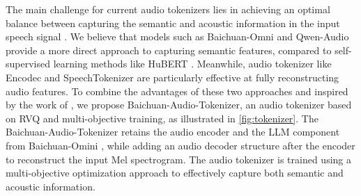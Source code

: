 \par The main challenge for current audio tokenizers lies in achieving an optimal balance between capturing the semantic and acoustic information in the input speech signal \cite{wang2024speech}. We believe that models such as Baichuan-Omni and Qwen-Audio provide a more direct approach to capturing semantic features, compared to self-supervised learning methods like HuBERT \cite{hsu2021hubert}. Meanwhile, audio tokenizer like Encodec \cite{defossez2022high} and SpeechTokenizer \cite{zhang2024speechtokenizer} are particularly effective at fully reconstructing audio features. To combine the advantages of these two approaches and inspired by the work of \cite{wu2024vila}, we propose Baichuan-Audio-Tokenizer, an audio tokenizer based on RVQ \cite{defossez2022high} and multi-objective training, as illustrated in \autoref{fig:tokenizer}. The Baichuan-Audio-Tokenizer retains the audio encoder and the LLM component from Baichuan-Omini \cite{li2024baichuan}, while adding an audio decoder structure after the encoder to reconstruct the input Mel spectrogram. The audio tokenizer is trained using a multi-objective optimization approach to effectively capture both semantic and acoustic information.


